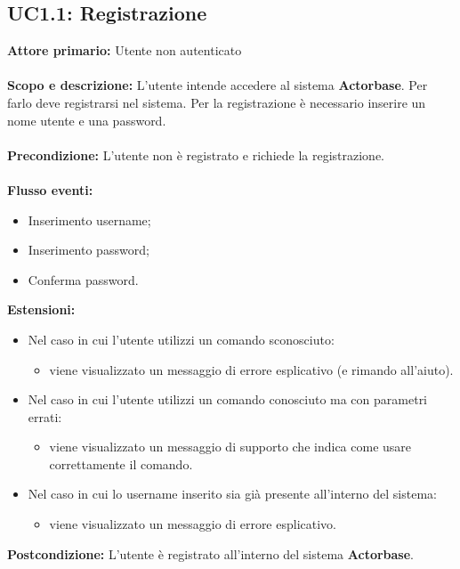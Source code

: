 \documentclass{scalatekids-article}
\begin{document}
\subsection{UC1.1: Registrazione}
\textbf{Attore primario:} Utente non autenticato\\ \\
\textbf{Scopo e descrizione:} L'utente intende accedere al sistema \textbf{Actorbase}. Per farlo deve registrarsi nel sistema.
Per la registrazione è necessario inserire un nome utente e una password.\\ \\
\textbf{Precondizione:} L'utente non è registrato e richiede la registrazione.\\ \\
\textbf{Flusso eventi:}
\begin{itemize}
\item Inserimento username;
\item Inserimento password;
\item Conferma password.
\end{itemize}
\textbf{Estensioni:}
\begin{itemize}
\item Nel caso in cui l'utente utilizzi un comando sconosciuto:
  \begin{itemize}
  \item viene visualizzato un messaggio di errore esplicativo (e rimando all'aiuto).
  \end{itemize}
\item Nel caso in cui l'utente utilizzi un comando conosciuto ma con parametri errati:
  \begin{itemize}
  \item viene visualizzato un messaggio di supporto che indica come usare correttamente il comando.
  \end{itemize}
\item Nel caso in cui lo username inserito sia già presente all'interno del sistema:
  \begin{itemize}
  \item viene visualizzato un messaggio di errore esplicativo.
  \end{itemize}
\end{itemize}
\textbf{Postcondizione:} L'utente è registrato all'interno del sistema \textbf{Actorbase}.
\end{document}
